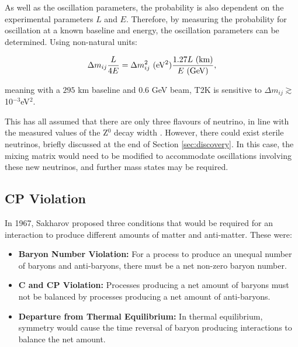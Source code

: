 As well as the oscillation parameters, the probability is also dependent on the experimental parameters $L$ and $E$. Therefore, by measuring the probability for oscillation at a known baseline and energy, the oscillation parameters can be determined. Using non-natural units:

\begin{equation}
\Delta m_{ij} \frac{L}{4E} = \Delta m_{ij}^2 \text{ (eV$^2$)} \frac{1.27 L \text{ (km)}}{E\text{ (GeV)}},
\vspace{10pt}
\end{equation}

meaning with a $295$ km baseline and $0.6$ GeV beam, T2K is sensitive to $\Delta m_{ij} \gtrsim$ 10$^{-3}$eV$^2$.

This has all assumed that there are only three flavours of neutrino, in line with the measured values of the Z$^0$ decay width \cite{lepslac,universalN}. However, there could exist sterile neutrinos, briefly discussed at the end of Section \ref{sec:discovery}. In this case, the mixing matrix would need to be modified to accommodate oscillations involving these new neutrinos, and further mass states may be required. 

\subsection{CP Violation}
\label{cpv}

In 1967, Sakharov proposed three conditions that would be required for an interaction to produce different amounts of matter and anti-matter\cite{sakharov}. These were:

\begin{itemize} 

\item \textbf{Baryon Number Violation:} For a process to produce an unequal number of baryons and anti-baryons, there must be a net non-zero baryon number.

\item \textbf{C and CP Violation:} Processes producing a net amount of baryons must not be balanced by processes producing a net amount of anti-baryons.

\item \textbf{Departure from Thermal Equilibrium:} In thermal equilibrium, \CPT symmetry would cause the time reversal of baryon producing interactions to balance the net amount.

\end{itemize}

